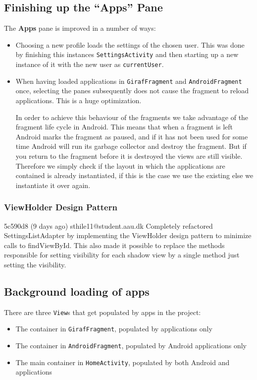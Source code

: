 \subsection{Finishing up the ``Apps'' Pane}

The \textbf{Apps} pane is improved in a number of ways:
\begin{itemize}
\item Choosing a new profile loads the settings of the chosen user.
This was done by finishing this instances \lstinline|SettingsActivity| and then starting up a new instance of it with the new user as \lstinline|currentUser|.
\item When having loaded applications in \lstinline|GirafFragment| and \lstinline|AndroidFragment| once, selecting the panes subsequently does not cause the fragment to reload applications. This is a huge optimization.

In order to achieve this behaviour of the fragments we take advantage of the fragment life cycle in Android. This means that when a fragment is left Android marks the fragment as paused, and if it has not been used for some time Android will run its garbage collector and destroy the fragment. But if you return to the fragment before it is destroyed the views are still visible. Therefore we simply check if the layout in which the applications are contained is already instantiated, if this is the case we use the existing else we instantiate it over again.

\end{itemize}

\subsubsection{ViewHolder Design Pattern}
5c590d8 (9 days ago) sthile11@student.aau.dk Completely refactored SettingsListAdapter by implementing the ViewHolder design pattern to minimize calls to findViewById. This also made it possible to replace the methods responsible for setting visibility for each shadow view by a single method just setting the visibility.

\subsection{Background loading of apps}\label{sec:sprint4:dev:loadapplicationtask}
There are three \lstinline!View!s that get populated by apps in the \launcher project:

\begin{itemize}
\item The container in \lstinline!GirafFragment!, populated by \giraf applications only
\item The container in \lstinline!AndroidFragment!, populated by Android applications only
\item The main container in \lstinline!HomeActivity!, populated by both Android and \giraf applications
\end{itemize}

